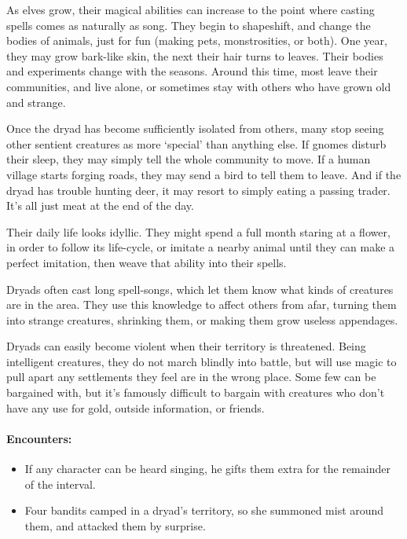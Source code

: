 \begin{multicols}{2}


\noindent
As elves grow, their magical abilities can increase to the point where casting spells comes as naturally as song.
They begin to shapeshift, and change the bodies of animals, just for fun (making pets, monstrosities, or both).
One year, they may grow bark-like skin, the next their hair turns to leaves.
Their bodies and experiments change with the seasons.
Around this time, most leave their communities, and live alone, or sometimes stay with others who have grown old and strange.

Once the dryad has become sufficiently isolated from others, many stop seeing other sentient creatures as more `special' than anything else.
If gnomes disturb their sleep, they may simply tell the whole community to move.
If a human village starts forging roads, they may send a bird to tell them to leave.
And if the dryad has trouble hunting deer, it may resort to simply eating a passing trader.
It's all just meat at the end of the day.

Their daily life looks idyllic.
They might spend a full month staring at a flower, in order to follow its life-cycle, or imitate a nearby animal until they can make a perfect imitation, then weave that ability into their spells.

\dryad

\showStdSpells

Dryads often cast long spell-songs, which let them know what kinds of creatures are in the area.
They use this knowledge to affect others from afar, turning them into strange creatures, shrinking them, or making them grow useless appendages.

Dryads can easily become violent when their territory is threatened.
Being intelligent creatures, they do not march blindly into battle, but will use magic to pull apart any settlements they feel are in the wrong place.
Some few can be bargained with, but it's famously difficult to bargain with creatures who don't have any use for gold, outside information, or friends.

\paragraph{Encounters:}

\begin{itemize}

  \item
  If any character can be heard singing, he gifts them extra  for the remainder of the \gls{interval}.
  \item
  Four bandits camped in a dryad's territory, so she summoned mist around them, and attacked them by surprise.


\end{itemize}
\end{multicols}
